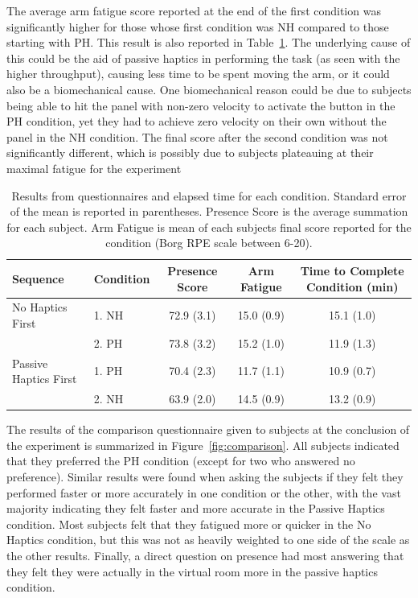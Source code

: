 \documentclass[]{aiaa-tc}%
\begin{document}
The average arm fatigue score reported at the end of the first condition was significantly higher for those whose first condition was NH compared to those starting with PH.
This result is also reported in Table~\ref{tab:subjective}.
The underlying cause of this could be the aid of passive haptics in performing the task (as seen with the higher throughput), causing less time to be spent moving the arm, or it could also be a biomechanical cause.
One biomechanical reason could be due to subjects being able to hit the panel with non-zero velocity to activate the button in the PH condition, yet they had to achieve zero velocity on their own without the panel in the NH condition.
The final score after the second condition was not significantly different, which is possibly due to subjects plateauing at their maximal fatigue for the experiment

\begin{table}
  \centering
  \begin{tabular}{llccc}
    Sequence & Condition & Presence Score & Arm Fatigue & Time to Complete Condition (min) \\
    \hline\hline
    No Haptics First & 1. NH & 72.9 (3.1) & 15.0 (0.9) & 15.1 (1.0) \\
    & 2. PH & 73.8 (3.2) & 15.2 (1.0) & 11.9 (1.3) \\
    \hline
    Passive Haptics First & 1. PH & 70.4 (2.3) & 11.7 (1.1) & 10.9 (0.7) \\
    & 2. NH & 63.9 (2.0) & 14.5 (0.9) & 13.2 (0.9) \\
  \end{tabular}
  \caption{Results from questionnaires and elapsed time for each condition. Standard error of the mean is reported in parentheses. Presence Score is the average summation for each subject. Arm Fatigue is mean of each subjects final score reported for the condition (Borg RPE scale between 6-20).}
  \label{tab:subjective}
\end{table}

The results of the comparison questionnaire given to subjects at the conclusion of the experiment is summarized in Figure~\ref{fig:comparison}.
All subjects indicated that they preferred the PH condition (except for two who answered no preference).
Similar results were found when asking the subjects if they felt they performed faster or more accurately in one condition or the other, with the vast majority indicating they felt faster and more accurate in the Passive Haptics condition.
Most subjects felt that they fatigued more or quicker in the No Haptics condition, but this was not as heavily weighted to one side of the scale as the other results.
Finally, a direct question on presence had most answering that they felt they were actually in the virtual room more in the passive haptics condition.
\end{document}
